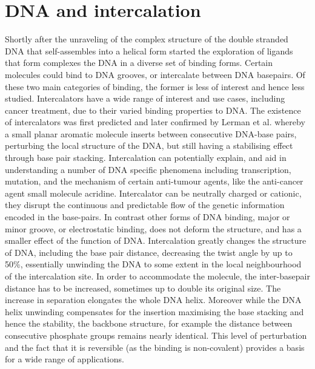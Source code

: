 \section{DNA and intercalation}

Shortly after the unraveling of the complex structure of the double stranded DNA that self-assembles into a helical form started the exploration of ligands that form complexes the DNA in a diverse set of binding forms. Certain molecules could bind to DNA grooves, or intercalate between DNA basepairs. Of these two main categories of binding, the former is less of interest and hence less studied. Intercalators have a wide range of interest and use cases, including cancer treatment, due to their varied binding properties to DNA. The existence of intercalators was first predicted and later confirmed by Lerman et al. whereby a small planar aromatic molecule inserts between consecutive DNA-base pairs, perturbing the local structure of the DNA, but still having a stabilising effect through base pair stacking. Intercalation can potentially explain, and aid in understanding a number of DNA specific phenomena including transcription, mutation, and the mechanism of certain anti-tumour agents, like the anti-cancer agent small molecule acridine. Intercalator can be neutrally charged or cationic, they disrupt the continuous and predictable flow of the genetic information encoded in the base-pairs. In contrast other forms of DNA binding, major or minor groove, or electrostatic binding, does not deform the structure, and has a smaller effect of the function of DNA. Intercalation greatly changes the structure of DNA, including the base pair distance, decreasing the twist angle by up to 50\%, essentially unwinding the DNA to some extent in the local neighbourhood of the intercalation site. In order to accommodate the molecule, the inter-basepair distance has to be increased, sometimes up to double its original size. The increase in separation elongates the whole DNA helix. Moreover while the DNA helix unwinding compensates for the insertion maximising the base stacking and hence the stability, the backbone structure, for example the distance between consecutive phosphate groups remains nearly identical. This level of perturbation and the fact that it is reversible (as the binding is non-covalent) provides a basis for a wide range of applications.


